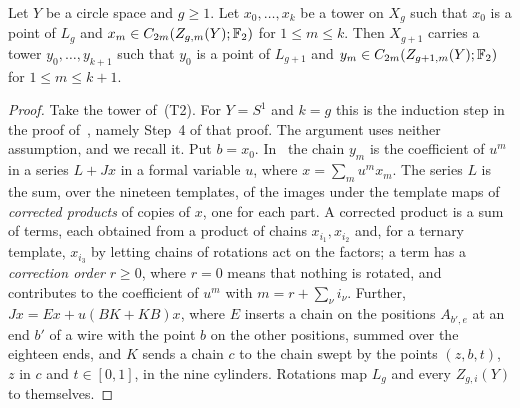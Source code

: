 \begin{lemma}[Supports]\label{lem:supports}
Let $Y$ be a circle space and $g\ge1$. Let $x_0,\ldots,x_k$ be a tower on $X_g$ such that $x_0$ is a point of $L_g$ and $x_m\in C_{2m}(Z_{g,m}(Y);\mathbb F_2)$ for $1\le m\le k$. Then $X_{g+1}$ carries a tower $y_0,\ldots,y_{k+1}$ such that $y_0$ is a point of $L_{g+1}$ and $y_m\in C_{2m}(Z_{g+1,m}(Y);\mathbb F_2)$ for $1\le m\le k+1$.
\end{lemma}
\begin{proof}
Take the tower of~(T2). For $Y=S^1$ and $k=g$ this is the induction step in the proof of~\cite[Lemma~B.1(b)]{Z}, namely Step~4 of that proof. The argument uses neither assumption, and we recall it. Put $b=x_0$. In~\cite{Z} the chain $y_m$ is the coefficient of $u^m$ in a series $L+Jx$ in a formal variable $u$, where $x=\sum_mu^mx_m$. The series $L$ is the sum, over the nineteen templates, of the images under the template maps of \emph{corrected products} of copies of $x$, one for each part. A corrected product is a sum of terms, each obtained from a product of chains $x_{i_1},x_{i_2}$ and, for a ternary template, $x_{i_3}$ by letting chains of rotations act on the factors; a term has a \emph{correction order} $r\ge0$, where $r=0$ means that nothing is rotated, and contributes to the coefficient of $u^m$ with $m=r+\sum_\nu i_\nu$. Further, $Jx=Ex+u(BK+KB)x$, where $E$ inserts a chain on the positions $A_{b',e}$ at an end $b'$ of a wire with the point $b$ on the other positions, summed over the eighteen ends, and $K$ sends a chain $c$ to the chain swept by the points $(z,b,t)$, $z$ in $c$ and $t\in[0,1]$, in the nine cylinders. Rotations map $L_g$ and every $Z_{g,i}(Y)$ to themselves.


\end{proof}
